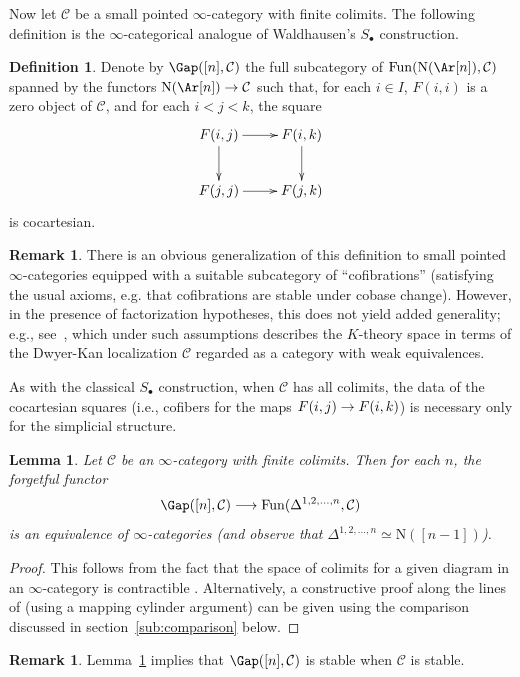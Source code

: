 \documentclass{amsart}
\newcommand{\ssdot}{\bullet}%
\newcommand{\Sdot}[1][\ssdot]{S_{#1}}
\newcommand{\htp}{\simeq}
\renewcommand{\to}{\mathchoice{\longrightarrow}{\rightarrow}{\rightarrow}{\rightarrow}}
\let\catsymbfont\mathcal
\newcommand{\aC}{{\catsymbfont{C}}}
\newcommand{\N}{\mathrm{N}}
\newcommand{\Fun}{\mathrm{Fun}} %
\renewcommand{\i}{\infty}
\numberwithin{equation}{section}
\newtheorem{lemma}[equation]{Lemma}
\theoremstyle{definition}
\newtheorem{definition}[equation]{Definition}
\newtheorem{remark}[equation]{Remark}
\begin{document}
Now let $\aC$ be a small pointed $\i$-category with finite colimits.
The following definition \cite[1.2.2.2]{HAG} is the $\i$-categorical
analogue of Waldhausen's $\Sdot$ construction.

\begin{definition}\label{defn:gap}
Denote by $\Gap([n],\aC)$ the full subcategory of
$\Fun(\N(\Ar[n]),\aC)$ spanned by the functors 
$\N(\Ar[n])\to\aC$ such that, for each $i\in I$, $F(i,i)$ is a zero
object of $\aC$, and for each $i<j<k$, the square
\[
\xymatrix{
F(i,j)\ar[r]\ar[d] & F(i,k)\ar[d]\\
F(j,j)\ar[r]       & F(j,k)}
\]
is cocartesian.
\end{definition}

\begin{remark}
There is an obvious generalization of this definition to small pointed
$\i$-categories equipped with a suitable subcategory of
``cofibrations'' (satisfying the usual axioms, e.g. that cofibrations
are stable under cobase change).  However, in the presence of
factorization hypotheses, this does not yield added generality; e.g.,
see~\cite[1.3]{BM4}, which under such assumptions describes the
$K$-theory space in terms of the Dwyer-Kan localization $\aC$ regarded
as a category with weak equivalences.
\end{remark}

As with the classical $\Sdot$ construction, when $\aC$ has all
colimits, the data of the cocartesian squares (i.e., cofibers for the
maps $F(i,j) \to F(i,k)$) is necessary only for the simplicial
structure.

\begin{lemma}\label{lem:dropcof}
Let $\aC$ be an $\i$-category with finite colimits.  Then for each
$n$, the forgetful functor 
\[
\Gap([n], \aC) \to \Fun(\Delta^{1,2,\ldots,n}, \aC)
\]
is an equivalence of $\i$-categories (and observe that
$\Delta^{1,2,\ldots,n} \htp \N([n-1])$).
\end{lemma}

\begin{proof}
This follows from the fact that the space of colimits for a given
diagram in an $\i$-category is contractible \cite[1.2.12.9,
1.2.13.5]{HTT}.  Alternatively, a constructive proof along the lines
of \cite[2.9]{BM3} (using a mapping cylinder argument) can be given using
the comparison discussed in section~\ref{sub:comparison} below.
\end{proof}

\begin{remark}
Lemma~\ref{lem:dropcof} implies that $\Gap([n],\aC)$ is
stable when $\aC$ is stable.
\end{remark}
\end{document}
